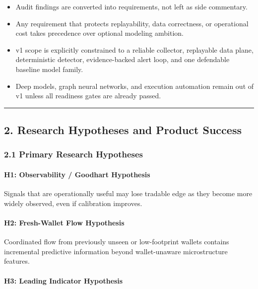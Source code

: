 \documentclass[
]{article}
\providecommand{\tightlist}{%
  \setlength{\itemsep}{0pt}\setlength{\parskip}{0pt}}
\begin{document}
\begin{itemize}
\tightlist
\item
  Audit findings are converted into requirements, not left as side
  commentary.
\item
  Any requirement that protects replayability, data correctness, or
  operational cost takes precedence over optional modeling ambition.
\item
  v1 scope is explicitly constrained to a reliable collector, replayable
  data plane, deterministic detector, evidence-backed alert loop, and
  one defendable baseline model family.
\item
  Deep models, graph neural networks, and execution automation remain
  out of v1 unless all readiness gates are already passed.
\end{itemize}

\begin{center}\rule{0.5\linewidth}{0.5pt}\end{center}

\subsection{2. Research Hypotheses and Product
Success}\label{2-research-hypotheses-and-product-success}

\subsubsection{2.1 Primary Research
Hypotheses}\label{21-primary-research-hypotheses}

\paragraph{H1: Observability / Goodhart
Hypothesis}\label{h1-observability--goodhart-hypothesis}

Signals that are operationally useful may lose tradable edge as they
become more widely observed, even if calibration improves.

\paragraph{H2: Fresh-Wallet Flow
Hypothesis}\label{h2-fresh-wallet-flow-hypothesis}

Coordinated flow from previously unseen or low-footprint wallets
contains incremental predictive information beyond wallet-unaware
microstructure features.

\paragraph{H3: Leading Indicator
Hypothesis}\label{h3-leading-indicator-hypothesis}
\end{document}
